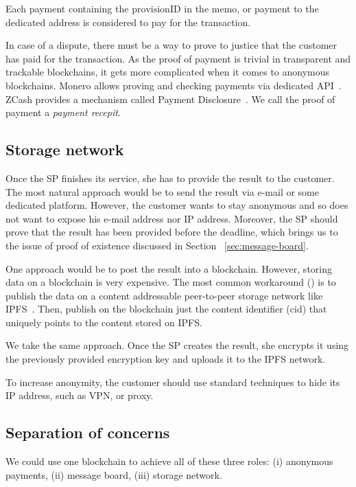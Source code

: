 \documentclass[pdftex,twocolumn,epjc3]{svjour3}
\begin{document}
{Each payment containing the $\textrm{provisionID}$ in the memo, or payment to the dedicated address is considered to pay for the transaction. 

In case of a dispute, there must be a way to prove to justice that the customer has paid for the transaction. As the proof of payment is trivial in transparent and trackable blockchains, it gets more complicated when it comes to anonymous blockchains. Monero allows proving and checking payments via dedicated API~\cite{moneroHowProvePayment}. ZCash provides a mechanism called Payment Disclosure~\cite{daviesIntroductionPaymentDisclosure2017}. We call the proof of payment a \textit{payment recepit}.

\subsection{Storage network}\label{storage-network}
Once the SP finishes its service, she has to provide the result to the customer. The most natural approach would be to send the result via e-mail or some dedicated platform. However, the customer wants to stay anonymous and so does not want to expose his e-mail address nor IP address. Moreover, the SP should prove that the result has been provided before the deadline, which brings us to the issue of proof of existence discussed in Section ~\ref{sec:message-board}.

One approach would be to post the result into a blockchain. However, storing data on a blockchain is very expensive. The most common workaround (\cite{shahidBlockchainBasedAgriFoodSupply2020, wangAuditableProtocolsFair2019, chenImprovedP2PFile2017}) is to publish the data on a content addressable peer-to-peer storage network like IPFS~\cite{benetIPFSContentAddressed2014}. Then, publish on the blockchain just the content identifier ($\mathrm{cid}$) that uniquely points to the content stored on IPFS.

We take the same approach. Once the SP creates the result, she encrypts it using the previously provided encryption key and uploads it to the IPFS network.

To increase anonymity, the customer should use standard techniques to hide its IP address, such as VPN, or proxy.

\subsection{Separation of concerns}
We could use one blockchain to achieve all of these three roles: (i) anonymous payments, (ii) message board, (iii) storage network.

}
\end{document}

